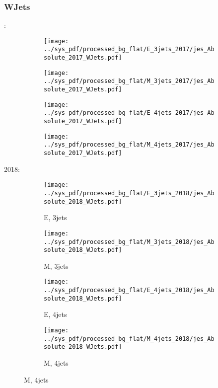 \documentclass{beamer}
\begin{document}
\begin{frame}
\frametitle{WJets}
\fontsize{5}{1}:
\begin{figure}
\centering
\begin{subfigure}[b]{0.24\textwidth}
\texttt{[image: ../sys\_pdf/processed\_bg\_flat/E\_3jets\_2017/jes\_Absolute\_2017\_WJets.pdf]}
\end{subfigure}
\begin{subfigure}[b]{0.24\textwidth}
\texttt{[image: ../sys\_pdf/processed\_bg\_flat/M\_3jets\_2017/jes\_Absolute\_2017\_WJets.pdf]}
\end{subfigure}
\begin{subfigure}[b]{0.24\textwidth}
\texttt{[image: ../sys\_pdf/processed\_bg\_flat/E\_4jets\_2017/jes\_Absolute\_2017\_WJets.pdf]}
\end{subfigure}
\begin{subfigure}[b]{0.24\textwidth}
\texttt{[image: ../sys\_pdf/processed\_bg\_flat/M\_4jets\_2017/jes\_Absolute\_2017\_WJets.pdf]}
\end{subfigure}
\end{figure}
2018:
\begin{figure}
\centering
\begin{subfigure}[b]{0.24\textwidth}
\texttt{[image: ../sys\_pdf/processed\_bg\_flat/E\_3jets\_2018/jes\_Absolute\_2018\_WJets.pdf]}
\captionsetup{font=tiny}
\caption{E, 3jets}
\end{subfigure}
\begin{subfigure}[b]{0.24\textwidth}
\texttt{[image: ../sys\_pdf/processed\_bg\_flat/M\_3jets\_2018/jes\_Absolute\_2018\_WJets.pdf]}
\captionsetup{font=tiny}
\caption{M, 3jets}
\end{subfigure}
\begin{subfigure}[b]{0.24\textwidth}
\texttt{[image: ../sys\_pdf/processed\_bg\_flat/E\_4jets\_2018/jes\_Absolute\_2018\_WJets.pdf]}
\captionsetup{font=tiny}
\caption{E, 4jets}
\end{subfigure}
\begin{subfigure}[b]{0.24\textwidth}
\texttt{[image: ../sys\_pdf/processed\_bg\_flat/M\_4jets\_2018/jes\_Absolute\_2018\_WJets.pdf]}
\captionsetup{font=tiny}
\caption{M, 4jets}
\end{subfigure}
\end{figure}
\end{frame}
\end{document}
